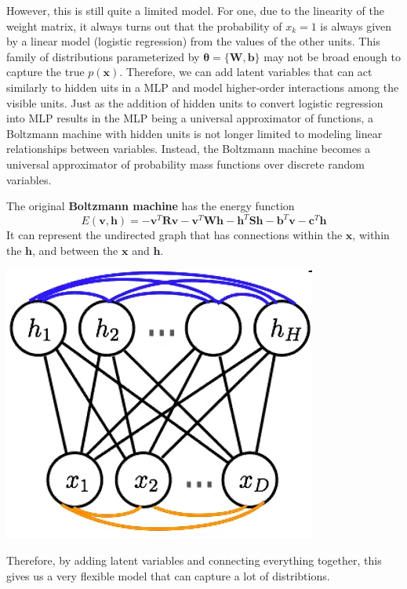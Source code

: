   However, this is still quite a limited model. For one, due to the linearity of the weight matrix, it always turns out that the probability of $x_k = 1$ is always given by a linear model (logistic regression) from the values of the other units. This family of distributions parameterized by $\boldsymbol{\theta} = \{\mathbf{W}, \mathbf{b}\}$ may not be broad enough to capture the true $p(\mathbf{x})$. Therefore, we can add latent variables that can act similarly to hidden uits in a MLP and model higher-order interactions among the visible units. Just as the addition of hidden units to convert logistic regression into MLP results in the MLP being a universal approximator of functions, a Boltzmann machine with hidden units is not longer limited to modeling linear relationships between variables. Instead, the Boltzmann machine becomes a universal approximator of probability mass functions over discrete random variables. 

  \begin{definition}
    The original \textbf{Boltzmann machine} has the energy function 
      \[E(\mathbf{v}, \mathbf{h}) = - \mathbf{v}^T \mathbf{R} \mathbf{v} - \mathbf{v}^T \mathbf{W} \mathbf{h} - \mathbf{h}^T \mathbf{S} \mathbf{h} - \mathbf{b}^T \mathbf{v} - \mathbf{c}^T \mathbf{h} \]
    It can represent the undirected graph that has connections within the $\mathbf{x}$, within the $\mathbf{h}$, and between the $\mathbf{x}$ and $\mathbf{h}$.
    \begin{center} 
      \includegraphics[scale=0.4]{img/07_Boltzmann/boltzmann_lateral.png}
    \end{center}
    Therefore, by adding latent variables and connecting everything together, this gives us a very flexible model that can capture a lot of distribtions.
  \end{definition} 

